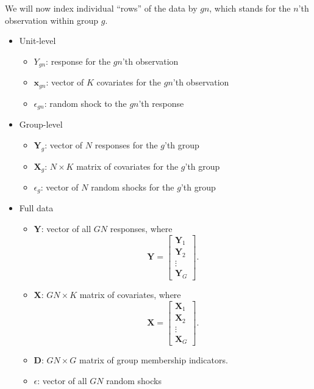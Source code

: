 \documentclass[
  12pt,
  oneside,openany]{book}
\providecommand{\tightlist}{%
  \setlength{\itemsep}{0pt}\setlength{\parskip}{0pt}}
\begin{document}
We will now index individual ``rows'' of the data by \(gn\), which stands for the \(n\)'th observation within group \(g\).

\begin{itemize}
\tightlist
\item
  Unit-level

  \begin{itemize}
  \tightlist
  \item
    \(Y_{gn}\): response for the \(gn\)'th observation
  \item
    \(\mathbf{x}_{gn}\): vector of \(K\) covariates for the \(gn\)'th observation
  \item
    \(\epsilon_{gn}\): random shock to the \(gn\)'th response
  \end{itemize}
\item
  Group-level

  \begin{itemize}
  \tightlist
  \item
    \(\mathbf{Y}_g\): vector of \(N\) responses for the \(g\)'th group
  \item
    \(\mathbf{X}_g\): \(N \times K\) matrix of covariates for the \(g\)'th group
  \item
    \(\epsilon_g\): vector of \(N\) random shocks for the \(g\)'th group
  \end{itemize}
\item
  Full data

  \begin{itemize}
  \tightlist
  \item
    \(\mathbf{Y}\): vector of all \(GN\) responses, where \[\mathbf{Y} = \begin{bmatrix} \mathbf{Y}_1 \\ \mathbf{Y}_2 \\ \vdots \\ \mathbf{Y}_G \end{bmatrix}.\]
  \item
    \(\mathbf{X}\): \(GN \times K\) matrix of covariates, where \[\mathbf{X} = \begin{bmatrix} \mathbf{X}_1 \\ \mathbf{X}_2 \\ \vdots \\ \mathbf{X}_G \end{bmatrix}.\]
  \item
    \(\mathbf{D}\): \(GN \times G\) matrix of group membership indicators.
  \item
    \(\epsilon\): vector of all \(GN\) random shocks
  \end{itemize}
\end{itemize}
\end{document}
